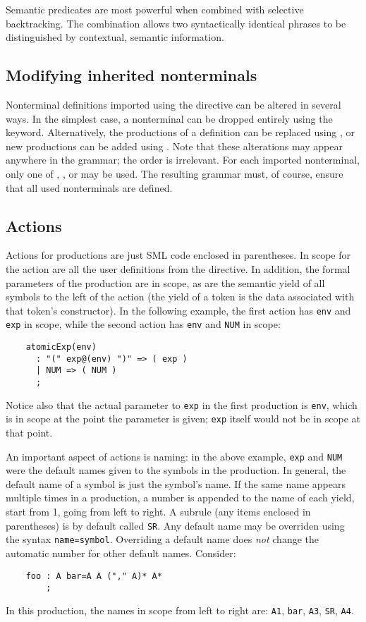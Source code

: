 Semantic predicates are most powerful when combined with selective backtracking.  The combination allows two syntactically identical phrases to be distinguished by contextual, semantic information.

\subsection{Modifying inherited nonterminals}\label{sec:antlr-inheritence}

Nonterminal definitions imported using the  directive can be altered in several ways.  In the simplest case, a nonterminal can be dropped entirely using the  keyword.  Alternatively, the productions of a definition can be replaced using , or new productions can be added using .  Note that these alterations may appear anywhere in the grammar; the order is irrelevant.  For each imported nonterminal, only one of , , or  may be used.  The resulting grammar must, of course, ensure that all used nonterminals are defined.

\subsection{Actions}\label{sec:antlr-actions}

Actions for productions are just SML code enclosed in parentheses.  In scope for the action are all the user definitions from the  directive.  In addition, the formal parameters of the production are in scope, as are the semantic yield of all symbols to the left of the action (the yield of a token is the data associated with that token's constructor).  In the following example, the first action has {\tt env} and {\tt exp} in scope, while the second action has {\tt env} and {\tt NUM} in scope:
\begin{verbatim}
    atomicExp(env)
      : "(" exp@(env) ")" => ( exp )
      | NUM => ( NUM )
      ;
\end{verbatim}
Notice also that the actual parameter to {\tt exp} in the first production is {\tt env}, which is in scope at the point the parameter is given; {\tt exp} itself would not be in scope at that point.

An important aspect of actions is naming: in the above example, {\tt exp} and {\tt NUM} were the default names given to the symbols in the production.  In general, the default name of a symbol is just the symbol's name.  If the same name appears multiple times in a production, a number is appended to the name of each yield, start from 1, going from left to right.  A subrule (any items enclosed in parentheses) is by default called {\tt SR}.  Any default name may be overriden using the syntax {\tt name=symbol}.  Overriding a default name does \emph{not} change the automatic number for other default names.  Consider:
\begin{verbatim}
    foo : A bar=A A ("," A)* A*
        ;
\end{verbatim}
In this production, the names in scope from left to right are: {\tt A1}, {\tt bar}, {\tt A3}, {\tt SR}, {\tt A4}.

